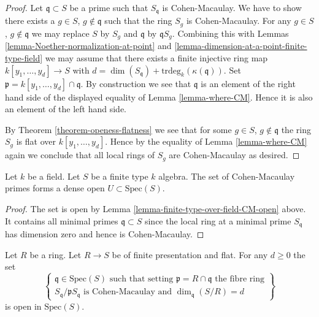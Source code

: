 \begin{proof}
Let $\mathfrak q \subset S$ be a prime such that $S_{\mathfrak q}$ is
Cohen-Macaulay. We have to show there exists a
$g \in S$, $g \not \in \mathfrak q$ such that the ring
$S_g$ is Cohen-Macaulay. For any $g \in S$, $g \not \in \mathfrak q$
we may replace $S$ by $S_g$ and $\mathfrak q$ by $\mathfrak qS_g$.
Combining this with
Lemmas \ref{lemma-Noether-normalization-at-point} and
\ref{lemma-dimension-at-a-point-finite-type-field}
we may assume that there exists a finite injective
ring map $k[y_1, \ldots, y_d] \to S$ with
$d = \dim(S_{\mathfrak q}) + \text{trdeg}_k(\kappa(\mathfrak q))$.
Set $\mathfrak p = k[y_1, \ldots, y_d] \cap \mathfrak q$.
By construction we see that $\mathfrak q$ is an element of
the right hand side of the displayed equality of
Lemma \ref{lemma-where-CM}. Hence it is also an element of
the left hand side.

\medskip\noindent
By Theorem \ref{theorem-openess-flatness} we see that for some $g \in S$,
$g \not \in \mathfrak q$ the ring $S_g$ is flat over $k[y_1, \ldots, y_d]$.
Hence by the equality of Lemma \ref{lemma-where-CM} again we conclude that
all local rings of $S_g$ are Cohen-Macaulay as desired.
\end{proof}

\begin{lemma}
\label{lemma-generic-CM}
Let $k$ be a field. Let $S$ be a finite type $k$ algebra.
The set of Cohen-Macaulay primes forms a dense open
$U \subset \text{Spec}(S)$.
\end{lemma}

\begin{proof}
The set is open by Lemma \ref{lemma-finite-type-over-field-CM-open} above.
It contains all minimal primes $\mathfrak q \subset S$
since the local ring at a minimal prime $S_{\mathfrak q}$
has dimension zero and hence is Cohen-Macaulay.
\end{proof}

\begin{lemma}
\label{lemma-finite-presentation-flat-CM-locus-open}
Let $R$ be a ring. Let $R \to S$ be of finite presentation
and flat. For any $d \geq 0$ the set
$$
\left\{
\begin{matrix}
\mathfrak q \in \text{Spec}(S)
\text{ such that setting }\mathfrak p = R \cap \mathfrak q
\text{ the fibre ring}\\
S_{\mathfrak q}/\mathfrak pS_{\mathfrak q}
\text{ is Cohen-Macaulay}
\text{ and } \dim_{\mathfrak q}(S/R) = d
\end{matrix}
\right\}
$$
is open in $\text{Spec}(S)$.
\end{lemma}

